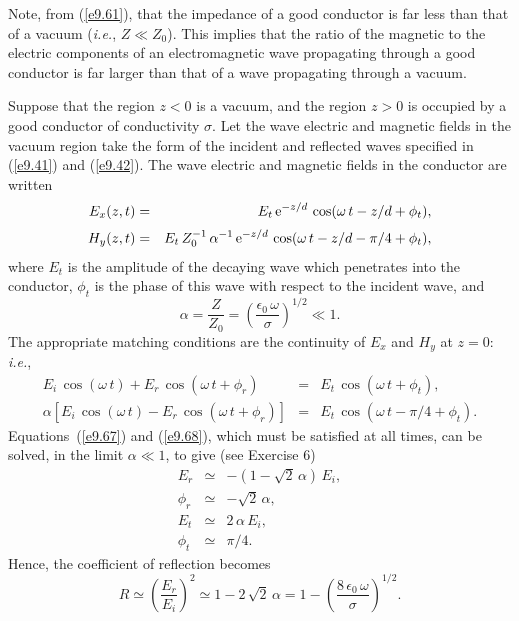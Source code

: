 Note, from (\ref{e9.61}), that the impedance of a good conductor is far less than
that of a vacuum ({\em i.e.}, $Z\ll Z_0$). This  implies that the ratio of the magnetic
to the electric components of an electromagnetic wave propagating through  a good conductor is far larger than that of a wave propagating through a vacuum.

Suppose that the region $z<0$ is a vacuum, and the region $z>0$ is
occupied by a good conductor of conductivity $\sigma$. Let the wave electric and
magnetic fields in the vacuum region take the form of the incident and reflected waves specified in (\ref{e9.41}) and (\ref{e9.42}).
The wave electric and magnetic fields in the conductor are written
\begin{eqnarray}
E_x(z,t) &=& E_t\,{\rm e}^{-z/d}\,\cos(\omega\,t-z/d+\phi_t),\\[0.5ex]
H_y(z,t) &=& E_t\,Z_0^{-1}\,\alpha^{-1}\,{\rm e}^{-z/d}\,\cos(\omega\,t-z/d-\pi/4+\phi_t),
\end{eqnarray}
where $E_t$ is the amplitude of the decaying wave which penetrates into the
conductor, $\phi_t$ is the phase of this wave with respect to the incident wave,
and
\begin{equation}
\alpha = \frac{Z}{Z_0}=\left(\frac{\epsilon_0\,\omega}{\sigma}\right)^{1/2}\ll 1.
\end{equation}
The appropriate matching conditions are the continuity of $E_x$ and $H_y$ at $z=0$:
{\em i.e.},
\begin{eqnarray}\label{e9.67}
E_i\,\cos(\omega\,t) + E_r\,\cos(\omega\,t+\phi_r) &=& E_t\,\cos(\omega\,t+\phi_t),\\[0.5ex]
\alpha\left[E_i\,\cos(\omega\,t) - E_r\,\cos(\omega\,t+\phi_r)\right]&=&E_t\,\cos(\omega\,t-\pi/4+\phi_t).\label{e9.68}
\end{eqnarray}
Equations~(\ref{e9.67}) and (\ref{e9.68}), which must be satisfied at all times, 
can be solved, in the limit $\alpha\ll 1$,  to give (see Exercise 6)
\begin{eqnarray}\label{e9.69}
E_r &\simeq&-(1-\sqrt{2}\,\alpha)\,E_i,\\[0.5ex]
\phi_r &\simeq& - \sqrt{2}\,\alpha,\\[0.5ex]
E_t&\simeq & 2\,\alpha\,E_i,\\[0.5ex]
\phi_t&\simeq & \pi/4.\label{e9.72}
\end{eqnarray}
Hence, the coefficient of reflection becomes
\begin{equation}\label{e9.73}
R \simeq\left(\frac{E_r}{E_i}\right)^2\simeq 1-2\,\sqrt{2}\,\alpha =1- \left(\frac{8\,\epsilon_0\,\omega}{\sigma}\right)^{1/2}.
\end{equation}

